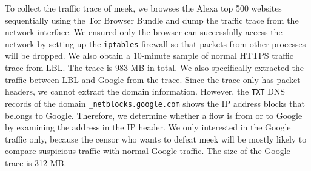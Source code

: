\documentclass[conference]{IEEEtran}
\begin{document}
To collect the traffic trace of meek, we browses the Alexa top 500 websites sequentially using 
the Tor Browser Bundle and dump the traffic trace from the network interface. We ensured only
the browser can successfully access the network by setting
up the \texttt{iptables} firewall so that packets from other processes will be dropped. We also 
obtain a 10-minute sample of normal HTTPS traffic trace from LBL. The trace is 983 MB in total. 
We also specifically extracted the traffic between LBL and Google from the trace. Since the trace 
only has packet headers, we cannot extract the domain information. However, the \texttt{TXT} DNS
records of the domain \texttt{\_netblocks.google.com} shows the IP address blocks that belongs to
Google. Therefore, we determine whether a flow is from or to Google by examining the address in the 
IP header. We only interested in the Google traffic only, because the censor who wants to defeat meek
will be mostly likely to compare suspicious traffic with normal Google traffic. The size of the 
Google trace is 312 MB. 
\end{document}
